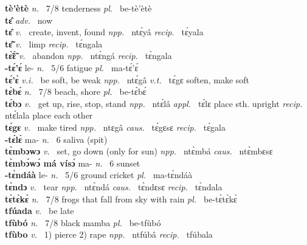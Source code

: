 {\bfseries tè'ètè}  {\itshape n.~} 7/8 tenderness {\itshape pl.~} be-tè'ètè    \\ 
{\bfseries tɛ̂}  {\itshape adv.~} now    \\ 
{\bfseries tɛ̂}  {\itshape v.~} create, invent, found   {\itshape npp.~} ntɛ́yâ {\itshape recip.~} tɛ́yala  \\ 
{\bfseries tɛ̃̂}  {\itshape v.~} limp   {\itshape recip.~} tɛ́ngala \\ 
{\bfseries tɛ̃̀ɛ̃̀}  {\itshape v.~} abandon   {\itshape npp.~} ntɛ̀ngá {\itshape recip.~} tɛ̀ngala  \\ 
{\bfseries -tɛ́'ɛ́} le- {\itshape n.~} 5/6 fatigue {\itshape pl.~} ma-tɛ́'ɛ́    \\ 
{\bfseries tɛ́'ɛ̀}  {\itshape v.i.~} be soft, be weak   {\itshape npp.~} ntɛ́gâ {\itshape v.t.~} tɛ́gɛ soften, make soft \\ 
{\bfseries tɛ̀bɛ́}  {\itshape n.~} 7/8 beach, shore {\itshape pl.~} be-tɛ̀bɛ́   \\ 
{\bfseries tɛ́bɔ}  {\itshape v.~} get up, rise, stop, stand   {\itshape npp.~} ntɛ́lâ {\itshape appl.~} tɛ́lɛ place sth. upright {\itshape recip.~} ntɛ́lala place each other  \\ 
{\bfseries tɛ́gɛ}  {\itshape v.~} make tired   {\itshape npp.~} ntɛgâ {\itshape caus.~} tɛ́gɛsɛ {\itshape recip.~} tɛ́gala  \\ 
{\bfseries -tɛ́lɛ̀} ma- {\itshape n.~} 6 saliva (spit)    \\ 
{\bfseries tɛ̀mbɔwɔ}  {\itshape v.~} set, go down (only for sun)   {\itshape npp.~} ntɛ̀mbá {\itshape caus.~} ntɛ̀mbɛsɛ  \\ 
{\bfseries tɛ̀mbɔ́wɔ́ má vísɔ́} ma- {\itshape n.~} 6 sunset    \\ 
{\bfseries -tɛ̀ndáà} le- {\itshape n.~} 5/6 ground cricket {\itshape pl.~} ma-tɛ̀ndáà    \\ 
{\bfseries tɛ̀ndɔ}  {\itshape v.~} tear   {\itshape npp.~} ntɛ̀ndá {\itshape caus.~} tɛ̀ndɛsɛ  {\itshape recip.~} tɛ̀ndala  \\ 
{\bfseries tɛ̀tɛ̀kɛ̀}  {\itshape n.~} 7/8 frogs that fall from sky with rain {\itshape pl.~} be-tɛ̀tɛ̀kɛ̀    \\ 
{\bfseries tfúada}  {\itshape v.~} be late   \\ 
{\bfseries tfùbó}  {\itshape n.~} 7/8 black mamba {\itshape pl.~} be-tfùbó    \\ 
{\bfseries tfùbo}  {\itshape v.~} 1) pierce 2) rape   {\itshape npp.~} ntfúbâ {\itshape recip.~} tfúbala  \\ 
